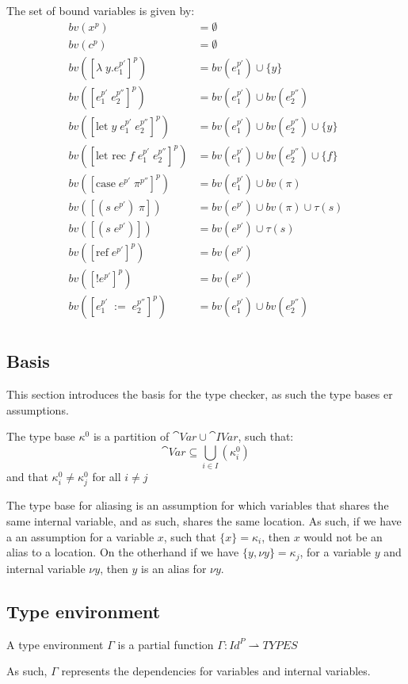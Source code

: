 \documentclass[../../master.tex]{subfiles}
\begin{document}
\begin{definition}
	The set of bound variables is given by:
	\begin{align*}
		bv(x^p)&=\emptyset\\
		bv(c^p)&=\emptyset\\
		bv([\lambda\;y.e_1^{p'}]^p)&=bv(e_1^{p'})\cup\{y\}\\
		bv([e_1^{p'}\;e_2^{p''}]^p)&=bv(e_1^{p'})\cup bv(e_2^{p''})\\
		bv([\mbox{let}\;y\;e_1^{p'}\;e_2^{p''}]^p)&=bv(e_1^{p'})\cup bv(e_2^{p''})\cup\{y\}\\
		bv([\mbox{let rec}\;f\;e_1^{p'}\;e_2^{p''}]^p)&=bv(e_1^{p'})\cup bv(e_2^{p''})\cup\{f\}\\
		bv([\mbox{case}\;e^{p'}\;\pi^{p''}]^p)&=bv(e_1^{p'})\cup bv(\pi)\\
		bv([(s\;e^{p'})\;\pi])&=bv(e^{p'})\cup bv(\pi)\cup\tau(s)\\
		bv([(s\;e^{p'})])&=bv(e^{p'})\cup\tau(s)\\
		bv([\mbox{ref}\;e^{p'}]^p)&=bv(e^{p'})\\
		bv([!e^{p'}]^p)&=bv(e^{p'})\\
		bv([e_1^{p'}\;:=\;e_2^{p''}]^p)&=bv(e_1^{p'})\cup bv(e_2^{p''})\\
	\end{align*}
\end{definition}


\subsection{Basis}
This section introduces the basis for the type checker, as such the type bases er assumptions.
\begin{definition}
	The type base $\kappa^0$ is a partition of $\cat{Var}\cup\cat{IVar}$, such that:
	$$\cat{Var}\subseteq\bigcup_{i\in I}(\kappa_i^0)$$
	and that $\kappa_i^0\neq\kappa_j^0$ for all $i\neq j$
\end{definition}
The type base for aliasing is an assumption for which variables that shares the same internal variable, and as such, shares the same location.
As such, if we have a an assumption for a variable $x$, such that $\{x\}=\kappa_i$, then $x$ would not be an alias to a location.
On the otherhand if we have $\{y,\nu y\}=\kappa_j$, for a variable $y$ and internal variable $\nu y$, then $y$ is an alias for $\nu y$.

\subsection{Type environment}
\begin{definition}
	A type environment $\Gamma$ is a partial function $\Gamma:Id^P\rightharpoonup TYPES$
\end{definition}
As such, $\Gamma$ represents the dependencies for variables and internal variables.
\end{document}
